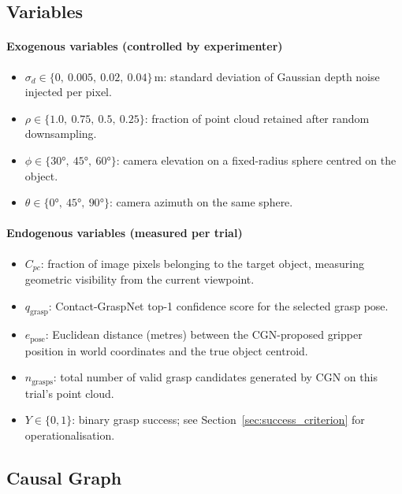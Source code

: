 \documentclass[journal]{IEEEtran}
\begin{document}
\subsection{Variables}

\paragraph{Exogenous variables (controlled by experimenter)}
\begin{itemize}
  \item $\sigma_d \in \{0,\ 0.005,\ 0.02,\ 0.04\}$\,m: standard
        deviation of Gaussian depth noise injected per pixel.
  \item $\rho \in \{1.0,\ 0.75,\ 0.5,\ 0.25\}$: fraction of point
        cloud retained after random downsampling.
  \item $\phi \in \{30°,\ 45°,\ 60°\}$: camera elevation on a
        fixed-radius sphere centred on the object.
  \item $\theta \in \{0°,\ 45°,\ 90°\}$: camera azimuth on the
        same sphere.
\end{itemize}

\paragraph{Endogenous variables (measured per trial)}
\begin{itemize}
  \item $C_{pc}$: fraction of image pixels belonging to the target
        object, measuring geometric visibility from the current
        viewpoint.
  \item $q_{\text{grasp}}$: Contact-GraspNet top-1 confidence score
        for the selected grasp pose.
  \item $e_{\text{pose}}$: Euclidean distance (metres) between the
        CGN-proposed gripper position in world coordinates and the
        true object centroid.
  \item $n_{\text{grasps}}$: total number of valid grasp candidates
        generated by CGN on this trial's point cloud.
  \item $Y \in \{0,1\}$: binary grasp success; see
        Section~\ref{sec:success_criterion} for operationalisation.
\end{itemize}

\subsection{Causal Graph}
\end{document}
